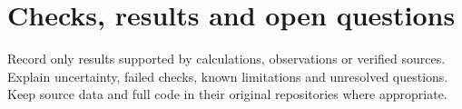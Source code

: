 \section{Checks, results and open questions}
Record only results supported by calculations, observations or verified sources.
Explain uncertainty, failed checks, known limitations and unresolved questions.
Keep source data and full code in their original repositories where appropriate.

